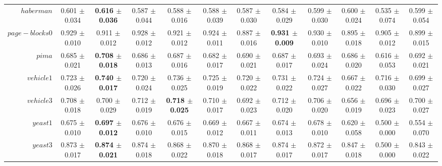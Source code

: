 \begin{table}[!ht]
{\begin{tabular}{r c c c c c c c c c c c}
$haberman$ & 0.601 $\pm$ 0.034 & \textbf{0.616 $\pm$ 0.036} & 0.587 $\pm$ 0.044 & 0.588 $\pm$ 0.016 & 0.588 $\pm$ 0.039 & 0.587 $\pm$ 0.030 & 0.584 $\pm$ 0.029 & 0.599 $\pm$ 0.030 & 0.600 $\pm$ 0.024 & 0.535 $\pm$ 0.074 & 0.599 $\pm$ 0.054 \\
$page-blocks0$ & 0.929 $\pm$ 0.010 & 0.911 $\pm$ 0.012 & 0.928 $\pm$ 0.012 & 0.921 $\pm$ 0.012 & 0.924 $\pm$ 0.011 & 0.887 $\pm$ 0.016 & \textbf{0.931 $\pm$ 0.009} & 0.930 $\pm$ 0.010 & 0.895 $\pm$ 0.018 & 0.905 $\pm$ 0.012 & 0.899 $\pm$ 0.015 \\
$pima$ & 0.685 $\pm$ 0.021 & \textbf{0.708 $\pm$ 0.018} & 0.686 $\pm$ 0.013 & 0.687 $\pm$ 0.016 & 0.682 $\pm$ 0.017 & 0.690 $\pm$ 0.021 & 0.687 $\pm$ 0.017 & 0.693 $\pm$ 0.024 & 0.686 $\pm$ 0.020 & 0.616 $\pm$ 0.053 & 0.692 $\pm$ 0.021 \\
$vehicle1$ & 0.723 $\pm$ 0.026 & \textbf{0.740 $\pm$ 0.017} & 0.720 $\pm$ 0.024 & 0.736 $\pm$ 0.025 & 0.725 $\pm$ 0.019 & 0.720 $\pm$ 0.022 & 0.731 $\pm$ 0.022 & 0.724 $\pm$ 0.027 & 0.667 $\pm$ 0.022 & 0.716 $\pm$ 0.030 & 0.699 $\pm$ 0.027 \\
$vehicle3$ & 0.708 $\pm$ 0.018 & 0.700 $\pm$ 0.029 & 0.712 $\pm$ 0.019 & \textbf{0.718 $\pm$ 0.025} & 0.710 $\pm$ 0.017 & 0.692 $\pm$ 0.023 & 0.712 $\pm$ 0.020 & 0.706 $\pm$ 0.020 & 0.656 $\pm$ 0.019 & 0.696 $\pm$ 0.023 & 0.700 $\pm$ 0.027 \\
$yeast1$ & 0.675 $\pm$ 0.010 & \textbf{0.697 $\pm$ 0.012} & 0.676 $\pm$ 0.010 & 0.676 $\pm$ 0.015 & 0.669 $\pm$ 0.012 & 0.667 $\pm$ 0.011 & 0.674 $\pm$ 0.013 & 0.678 $\pm$ 0.010 & 0.620 $\pm$ 0.058 & 0.500 $\pm$ 0.000 & 0.554 $\pm$ 0.070 \\
$yeast3$ & 0.873 $\pm$ 0.017 & \textbf{0.874 $\pm$ 0.021} & 0.874 $\pm$ 0.018 & 0.868 $\pm$ 0.022 & 0.870 $\pm$ 0.018 & 0.868 $\pm$ 0.017 & 0.874 $\pm$ 0.017 & 0.872 $\pm$ 0.017 & 0.847 $\pm$ 0.018 & 0.500 $\pm$ 0.000 & 0.843 $\pm$ 0.022 \\
\end{tabular}}
\end{table}
